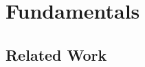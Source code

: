\section{Fundamentals}\label{sec:fundamentals}


\clearpage


\clearpage

\subsection{Related Work}\label{sec:relwork}